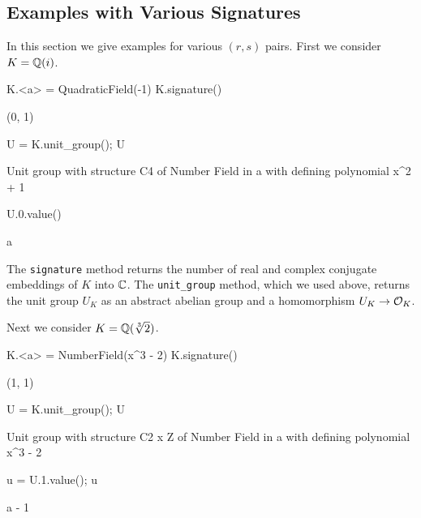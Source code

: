 \subsection{Examples with Various Signatures}
In this section we give examples for various $(r,s)$ pairs.
First we consider $K=\mathbb{Q}(i)$.
\begin{sagecode}
\begin{sagecell}
K.<a> = QuadraticField(-1)
K.signature()
\end{sagecell}
\begin{sageout}
(0, 1)
\end{sageout}
\begin{sagecell}
U = K.unit_group(); U
\end{sagecell}
\begin{sageout}
Unit group with structure C4 of Number Field in a with
defining polynomial x^2 + 1
\end{sageout}
\begin{sagecell}
U.0.value()
\end{sagecell}
\begin{sageout}
a
\end{sageout}
\end{sagecode}

The {\tt signature} method returns the
number of real and complex conjugate embeddings
of $K$ into $\mathbb{C}$.  The \verb|unit_group| method,
which we used above, returns the unit group $U_K$
as an abstract abelian group and a homomorphism $U_K\to \mathcal{O}_K$.

Next we consider $K=\mathbb{Q}(\sqrt[3]{2})$.
\begin{sagecode}
\begin{sagecell}
K.<a> = NumberField(x^3 - 2)
K.signature()
\end{sagecell}
\begin{sageout}
(1, 1)
\end{sageout}
\begin{sagecell}
U = K.unit_group(); U
\end{sagecell}
\begin{sageout}
Unit group with structure C2 x Z of Number Field in a with
defining polynomial x^3 - 2
\end{sageout}
\begin{sagecell}
\end{sagecell}
\begin{sageout}
[-1, a - 1]
\end{sageout}
\begin{sagecell}
u = U.1.value(); u
\end{sagecell}
\begin{sageout}
a - 1
\end{sageout}
\end{sagecode} %

